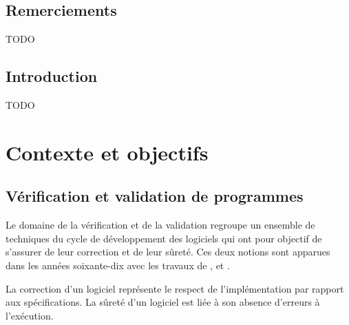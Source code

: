 \documentclass[french]{spimufcphdthesis}
\begin{document}
\chapter*{Remerciements}

TODO


\tableofcontents
\mainmatter


\chapter*{Introduction}

TODO


\part{Contexte et objectifs}


\chapter{Vérification et validation de programmes}


Le domaine de la vérification et de la validation regroupe un ensemble de
techniques du cycle de développement des logiciels qui ont pour objectif de
s'assurer de leur correction et de leur sûreté. Ces deux notions sont apparues
dans les années soixante-dix avec les travaux de  \cite{Dijkstra},
 \cite{Floyd} et  \cite{Hoare}.

La correction d'un logiciel représente le respect de l'implémentation par
rapport aux spécifications. La sûreté d'un logiciel est liée à son absence
d'erreurs à l'exécution.




\end{document}
